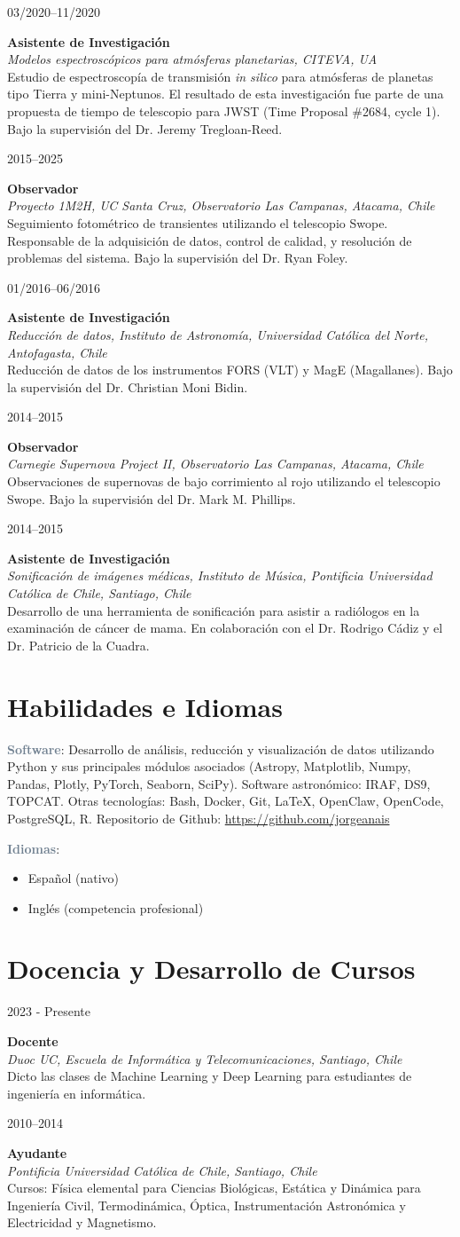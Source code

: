 \documentclass[10pt, a4paper]{article}
\newlength{\datebox}
\newlength{\textbox}
\newcommand{\workitem}[4]{\noindent\parbox[t]{\datebox}{#1}%
    \parbox[t]{\textbox}{\textbf{\textcolor{ViridianGreen}{#2}}\\
    \textit{#3}\\\textcolor{Jet}{\small #4}}\par\vspace{0.4cm}}
\newcommand{\skillitem}[2]{\noindent\textbf{\textcolor{SlateGray}{#1}}: #2\par\vspace{0.2cm}}
\begin{document}
\workitem{03/2020--11/2020}{Asistente de Investigación}{Modelos espectroscópicos para atmósferas planetarias, CITEVA, UA}{Estudio de espectroscopía de transmisión \textit{in silico} para atmósferas de planetas tipo Tierra y mini-Neptunos. El resultado de esta investigación fue parte de una propuesta de tiempo de telescopio para JWST (Time Proposal \#2684, cycle 1). Bajo la supervisión del Dr. Jeremy Tregloan-Reed.}
\workitem{2015--2025}{Observador}{Proyecto 1M2H, UC Santa Cruz, Observatorio Las Campanas, Atacama, Chile}{Seguimiento fotométrico de transientes utilizando el telescopio Swope. Responsable de la adquisición de datos, control de calidad, y resolución de problemas del sistema. Bajo la supervisión del Dr. Ryan Foley.}
\workitem{01/2016--06/2016}{Asistente de Investigación}{Reducción de datos, Instituto de Astronomía, Universidad Católica del Norte, Antofagasta, Chile}{Reducción de datos de los instrumentos FORS (VLT) y MagE (Magallanes). Bajo la supervisión del Dr. Christian Moni Bidin.}
\workitem{2014--2015}{Observador}{Carnegie Supernova Project II, Observatorio Las Campanas, Atacama, Chile}{Observaciones de supernovas de bajo corrimiento al rojo utilizando el telescopio Swope. Bajo la supervisión del Dr. Mark M. Phillips.}
\workitem{2014--2015}{Asistente de Investigación}{Sonificación de imágenes médicas, Instituto de Música, Pontificia Universidad Católica de Chile, Santiago, Chile}{Desarrollo de una herramienta de sonificación para asistir a radiólogos en la examinación de cáncer de mama. En colaboración con el Dr. Rodrigo Cádiz y el Dr. Patricio de la Cuadra.}

\section*{Habilidades e Idiomas}
\skillitem{Software}{Desarrollo de análisis, reducción y visualización de datos utilizando Python y sus principales módulos asociados (Astropy, Matplotlib, Numpy, Pandas, Plotly, PyTorch, Seaborn, SciPy). Software astronómico: IRAF, DS9, TOPCAT. Otras tecnologías: Bash, Docker, Git, \LaTeX, OpenClaw, OpenCode, PostgreSQL, R. Repositorio de Github: \url{https://github.com/jorgeanais}}
\skillitem{Idiomas}{
\begin{itemize}
    \item Español (nativo)
    \item Inglés (competencia profesional)
\end{itemize}}

\section*{Docencia y Desarrollo de Cursos}
\workitem{2023 - Presente}{Docente}{Duoc UC, Escuela de Informática y Telecomunicaciones, Santiago, Chile}{Dicto las clases de Machine Learning y Deep Learning para estudiantes de ingeniería en informática.}
\workitem{2010--2014}{Ayudante}{Pontificia Universidad Católica de Chile, Santiago, Chile}{Cursos: Física elemental para Ciencias Biológicas, Estática y Dinámica para Ingeniería Civil, Termodinámica, Óptica, Instrumentación Astronómica y Electricidad y Magnetismo.}
\end{document}
